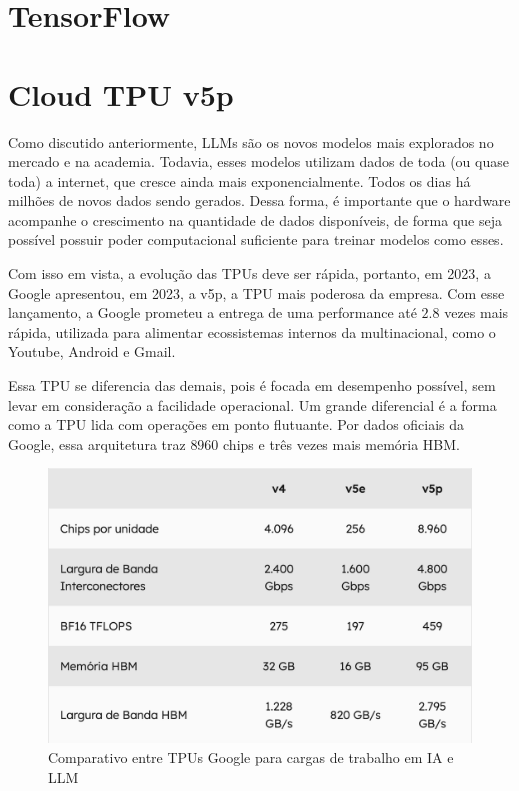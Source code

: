 \documentclass{report}
\begin{document}
\chapter{TensorFlow}

\chapter{Cloud TPU v5p}

Como discutido anteriormente, LLMs são os novos modelos mais explorados no mercado e na academia. Todavia, esses modelos utilizam dados de toda (ou quase toda) a internet, que cresce ainda mais exponencialmente. Todos os dias há milhões de novos dados sendo gerados. Dessa forma, é importante que o hardware acompanhe o crescimento na quantidade de dados disponíveis, de forma que seja possível possuir poder computacional suficiente para treinar modelos como esses.

Com isso em vista, a evolução das TPUs deve ser rápida, portanto, em 2023, a Google apresentou, em 2023, a v5p, a TPU mais poderosa da empresa. Com esse lançamento, a Google prometeu a entrega de uma performance até $2.8$ vezes mais rápida, utilizada para alimentar ecossistemas internos da multinacional, como o Youtube, Android e Gmail.

Essa TPU se diferencia das demais, pois é focada em desempenho possível, sem levar em consideração a facilidade operacional. Um grande diferencial é a forma como a TPU lida com operações em ponto flutuante. Por dados oficiais da Google, essa arquitetura traz $8960$ chips e três vezes mais memória HBM.

\begin{figure}[h]
\includegraphics[scale=0.5]{comparativo-tpus}
\centering
\caption{Comparativo entre TPUs Google para cargas de trabalho em IA e LLM}
\end{figure}
\end{document}
